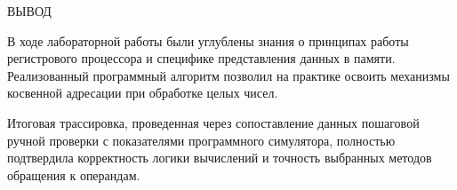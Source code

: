 \begin{center}
    ВЫВОД
\end{center}

В ходе лабораторной работы были углублены знания о принципах работы регистрового процессора и специфике представления данных в памяти. 
Реализованный программный алгоритм позволил на практике освоить механизмы косвенной адресации при обработке целых чисел.

Итоговая трассировка, проведенная через сопоставление данных пошаговой ручной проверки с показателями программного симулятора, 
полностью подтвердила корректность логики вычислений и точность выбранных методов обращения к операндам.